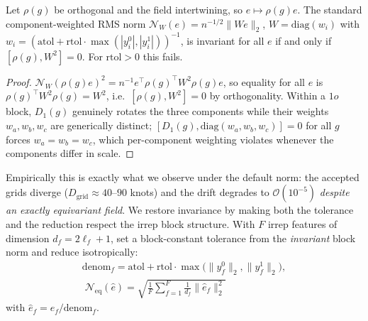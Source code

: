 \begin{proposition}
\label{prop:fail}
Let $\rho(g)$ be orthogonal and the field intertwining, so $e\mapsto\rho(g)e$. The standard
component-weighted RMS norm $\mathcal{N}_W(e)=n^{-1/2}\|We\|_2$, $W=\mathrm{diag}(w_i)$ with
$w_i=(\mathrm{atol}+\mathrm{rtol}\cdot\max(|y^0_i|,|y^1_i|))^{-1}$, is invariant for all $e$ if and
only if $[\rho(g),W^2]=0$. For $\mathrm{rtol}>0$ this fails.
\end{proposition}
\begin{proof}
$\mathcal{N}_W(\rho(g)e)^2=n^{-1}e^{\!\top}\rho(g)^{\!\top}W^2\rho(g)e$, so equality for all $e$ is
$\rho(g)^{\!\top}W^2\rho(g)=W^2$, i.e.\ $[\rho(g),W^2]=0$ by orthogonality. Within a $1o$ block,
$D_1(g)$ genuinely rotates the three components while their weights $w_a,w_b,w_c$ are generically
distinct; $[D_1(g),\mathrm{diag}(w_a,w_b,w_c)]=0$ for all $g$ forces $w_a=w_b=w_c$, which
per-component weighting violates whenever the components differ in scale.
\end{proof}
%
Empirically this is exactly what we observe under the default norm: the accepted grids diverge
($D_{\text{grid}}\approx40\text{--}90$ knots) and the drift degrades to $\mathcal{O}(10^{-5})$
\emph{despite an exactly equivariant field}. We restore invariance by making both the tolerance and
the reduction respect the irrep block structure. With $F$ irrep features of dimension
$d_f=2\ell_f+1$, set a block-constant tolerance from the \emph{invariant} block norm and reduce
isotropically:
%
\begin{equation}
\label{eq:neq}
\begin{gathered}
\mathrm{denom}_f=\mathrm{atol}+\mathrm{rtol}\cdot\max\big(\|y^0_f\|_2,\|y^1_f\|_2\big),\\[2pt]
\boxed{\;\mathcal{N}_{\text{eq}}(\hat e)=\sqrt{\frac1F\sum_{f=1}^{F}\frac{1}{d_f}\|\hat e_f\|_2^2}\;}
\end{gathered}
\end{equation}
%
with $\hat e_f=e_f/\mathrm{denom}_f$.

